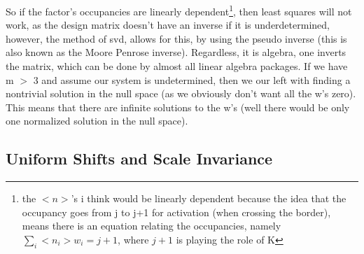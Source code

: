 So if the factor's occupancies are linearly dependent\footnote[2]{ the $<n>$'s i think would be linearly dependent because the idea that the occupancy goes from j to j+1 for activation (when crossing the border), means there is an equation relating the occupancies, namely $\sum_i<n_i>w_i = j+1$, where $j+1$ is playing the role of K}, then least squares will not work, as the design matrix doesn't have an inverse if it is underdetermined, however, the method of svd, allows for this, by using the pseudo inverse (this is also known as the Moore Penrose inverse).  Regardless, it is algebra, one inverts the matrix, which can be done by almost all linear algebra packages. If we have m $>$ 3 and assume our system is undetermined, then we our left with finding a nontrivial solution in the null space (as we obviously don't want all the w's zero).  This means that there are infinite solutions to the w's (well there would be only one normalized solution in the null space). 
\subsection{Uniform Shifts and Scale Invariance}

